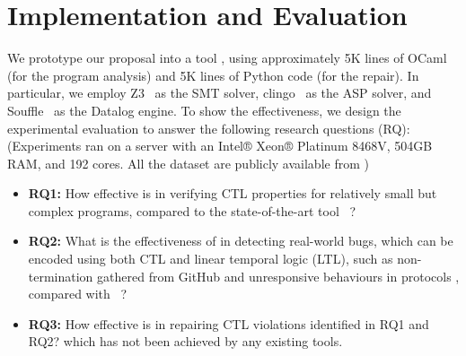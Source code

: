 

\section{Implementation and Evaluation}
\label{sec:evaluation}

We prototype our proposal into a tool \toolName, using approximately 5K lines of OCaml (for the program analysis) and 5K lines of Python code (for the repair). 
In particular, we employ Z3~\cite{DBLP:conf/tacas/MouraB08} as the SMT solver, clingo~\cite{DBLP:books/sp/Lifschitz19} as the ASP solver, and Souffle~\cite{scholz2016fast} as the Datalog engine. %
To show the effectiveness, 
we design the experimental evaluation to answer the 
following research questions (RQ):
(Experiments ran on a server with an Intel® Xeon® Platinum 8468V, 504GB RAM, and 192 cores. All the dataset are publicly available from \cite{zenodo_benchmark})

\begin{itemize}[align=left, leftmargin=*,labelindent=0pt]
\item \textbf{RQ1:} How effective is \toolName in verifying CTL properties for relatively small but complex programs, compared to the state-of-the-art tool  \function~\cite{DBLP:conf/sas/UrbanU018}?


\item \textbf{RQ2:} What is the effectiveness of \toolName in detecting real-world bugs, which can be encoded using both CTL and linear temporal logic (LTL), such as non-termination gathered from GitHub \cite{DBLP:conf/sigsoft/ShiXLZCL22} and unresponsive behaviours in protocols  \cite{DBLP:conf/icse/MengDLBR22}, compared with \ultimate~\cite{DBLP:conf/cav/DietschHLP15}?

\item \textbf{RQ3:} How effective is \toolName in repairing CTL violations identified in RQ1 and RQ2? which has not been achieved by any existing tools. 


 

\end{itemize}





